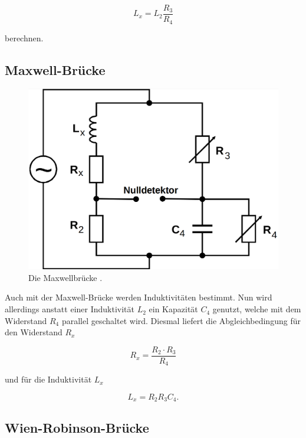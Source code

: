\begin{equation}
    L_x = L_2 \frac{R_3}{R_4}
\end{equation}

berechnen.

\subsection{Maxwell-Brücke}

\begin{figure}
    \centering
    \includegraphics[scale=0.25]{content/Maxwellbruecke.png}
    \caption{Die Maxwellbrücke \cite[S. 222]{anleitung}.}
    \label{fig:maxwell}
\end{figure}

Auch mit der Maxwell-Brücke werden Induktivitäten bestimmt. 
Nun wird allerdings anstatt einer Induktivität $L_2$ ein Kapazität $C_4$ genutzt,
welche mit dem Widerstand $R_4$ parallel geschaltet wird. 
Diesmal liefert die Abgleichbedingung für den Widerstand $R_x$

\begin{equation}
    R_x = \frac{R_2 \cdot R_3}{R_4}
\end{equation}

und für die Induktivität $L_x$

\begin{equation}
    L_x = R_2 R_3 C_4 .
\end{equation}

\subsection{Wien-Robinson-Brücke}

